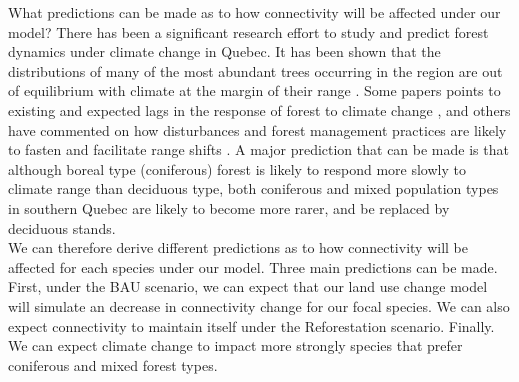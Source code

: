 \documentclass[12pt,Bold,TexShade]{thesis/mcgilletdclass}
\begin{document}
{What predictions can be made as to how connectivity will be affected under our model? There has been a significant research effort to study and predict forest dynamics under climate change in Quebec. It has been shown that the distributions of many of the most abundant trees occurring in the region are out of equilibrium with climate at the margin of their range \citep{talluto_extinction_2017}. Some papers points to existing and expected lags in the response of forest to climate change \citep{savage_elevational_2015}, and others have commented on how disturbances and forest management practices are likely to fasten and facilitate range shifts \citep{leithead_northward_2010, boulanger_climate_2019, vieira_paying_2020}. A major prediction that can be made is that although boreal type (coniferous) forest is likely to respond more slowly to climate range than deciduous type, both coniferous and mixed population types in southern Quebec are likely to become more rarer, and be replaced by deciduous stands. \\

We can therefore derive different predictions as to how connectivity will be affected for each species under our model. Three main predictions can be made. First, under the BAU scenario, we can expect that our land use change model will simulate an decrease in connectivity change for our focal species. We can also expect connectivity to maintain itself under the Reforestation scenario. Finally. We can expect climate change to impact more strongly species that prefer coniferous  and mixed forest types. \\

}%
\Intro


\end{document}
